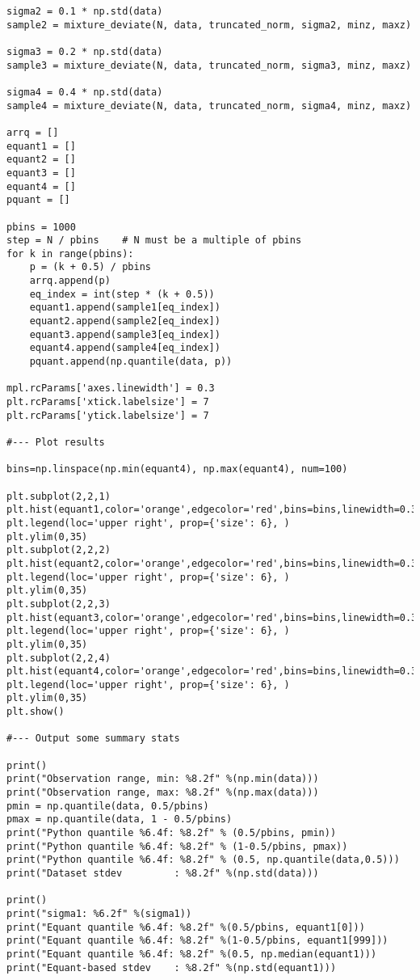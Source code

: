 \documentclass[oneside,10pt]{book}
\begin{document}
\begin{lstlisting}
sigma2 = 0.1 * np.std(data)
sample2 = mixture_deviate(N, data, truncated_norm, sigma2, minz, maxz)

sigma3 = 0.2 * np.std(data)
sample3 = mixture_deviate(N, data, truncated_norm, sigma3, minz, maxz)

sigma4 = 0.4 * np.std(data)
sample4 = mixture_deviate(N, data, truncated_norm, sigma4, minz, maxz)

arrq = []
equant1 = []
equant2 = []
equant3 = []
equant4 = []
pquant = []

pbins = 1000
step = N / pbins    # N must be a multiple of pbins
for k in range(pbins):
    p = (k + 0.5) / pbins
    arrq.append(p)
    eq_index = int(step * (k + 0.5))
    equant1.append(sample1[eq_index])
    equant2.append(sample2[eq_index])
    equant3.append(sample3[eq_index])
    equant4.append(sample4[eq_index])
    pquant.append(np.quantile(data, p))

mpl.rcParams['axes.linewidth'] = 0.3
plt.rcParams['xtick.labelsize'] = 7
plt.rcParams['ytick.labelsize'] = 7

#--- Plot results

bins=np.linspace(np.min(equant4), np.max(equant4), num=100)

plt.subplot(2,2,1)
plt.hist(equant1,color='orange',edgecolor='red',bins=bins,linewidth=0.3,label='v=0.0')
plt.legend(loc='upper right', prop={'size': 6}, )
plt.ylim(0,35)
plt.subplot(2,2,2)
plt.hist(equant2,color='orange',edgecolor='red',bins=bins,linewidth=0.3,label='v=0.1')
plt.legend(loc='upper right', prop={'size': 6}, )
plt.ylim(0,35)
plt.subplot(2,2,3)
plt.hist(equant3,color='orange',edgecolor='red',bins=bins,linewidth=0.3,label='v=0.2')
plt.legend(loc='upper right', prop={'size': 6}, )
plt.ylim(0,35)
plt.subplot(2,2,4)
plt.hist(equant4,color='orange',edgecolor='red',bins=bins,linewidth=0.3,label='v=0.4')
plt.legend(loc='upper right', prop={'size': 6}, )
plt.ylim(0,35)
plt.show()

#--- Output some summary stats

print()
print("Observation range, min: %8.2f" %(np.min(data)))
print("Observation range, max: %8.2f" %(np.max(data)))
pmin = np.quantile(data, 0.5/pbins)
pmax = np.quantile(data, 1 - 0.5/pbins)
print("Python quantile %6.4f: %8.2f" % (0.5/pbins, pmin))
print("Python quantile %6.4f: %8.2f" % (1-0.5/pbins, pmax))
print("Python quantile %6.4f: %8.2f" % (0.5, np.quantile(data,0.5)))
print("Dataset stdev         : %8.2f" %(np.std(data)))

print()
print("sigma1: %6.2f" %(sigma1))
print("Equant quantile %6.4f: %8.2f" %(0.5/pbins, equant1[0]))
print("Equant quantile %6.4f: %8.2f" %(1-0.5/pbins, equant1[999]))
print("Equant quantile %6.4f: %8.2f" %(0.5, np.median(equant1)))
print("Equant-based stdev    : %8.2f" %(np.std(equant1)))


\end{lstlisting}
\end{document}
